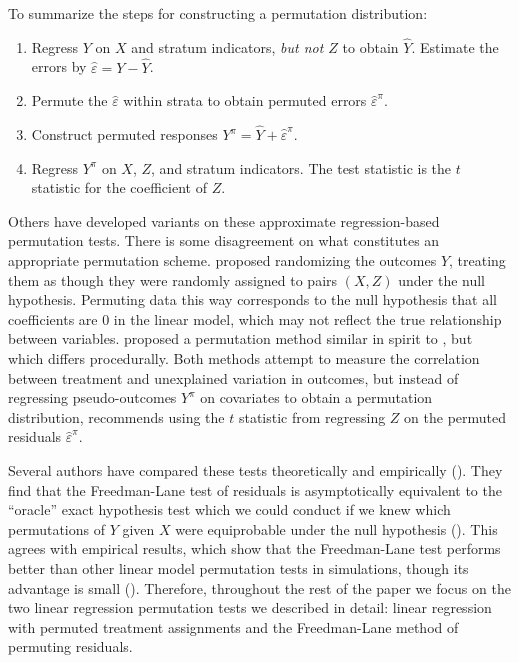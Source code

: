 \documentclass[12pt]{article}
\begin{document}
To summarize the steps for constructing a permutation distribution:

\begin{enumerate}
\item Regress $Y$ on $X$ and stratum indicators, \textit{but not $Z$} to obtain $\hat{Y}$. Estimate the errors by $\hat{\varepsilon} = Y - \hat{Y}$.
\item Permute the $\hat{\varepsilon}$ within strata to obtain permuted errors $\hat{\varepsilon}^\pi$.
\item Construct permuted responses $Y^\pi = \hat{Y}+ \hat{\varepsilon}^\pi$.
\item Regress $Y^\pi$ on $X$, $Z$, and stratum indicators. The test statistic is the $t$ statistic for the coefficient of $Z$.
\end{enumerate}


Others have developed variants on these approximate regression-based permutation tests. 
There is some disagreement on what constitutes an appropriate permutation scheme.
\cite{manly_randomization_2006} proposed randomizing the outcomes $Y$, treating them as though they were randomly assigned to pairs $(X, Z)$ under the null hypothesis.
Permuting data this way corresponds to the null hypothesis that all coefficients are 0 in the linear model, which may not reflect the true relationship between variables.
\cite{kennedy_randomization_1995} proposed a permutation method similar in spirit to \cite{freedman_nonstochastic_1983}, but which differs procedurally.
Both methods attempt to measure the correlation between treatment and unexplained variation in outcomes, but
instead of regressing pseudo-outcomes $Y^\pi$ on covariates to obtain a permutation distribution, \cite{kennedy_randomization_1995} recommends using the $t$ statistic from regressing $Z$ on the permuted residuals $\hat{\varepsilon}^\pi$. 

Several authors have compared these tests theoretically and empirically (\cite{anderson_empirical_1999, anderson_permutation_2001, kennedy_randomization_1996}).
They find that the Freedman-Lane test of residuals is asymptotically equivalent to the ``oracle'' exact hypothesis test which we could conduct if we knew which permutations of $Y$ given $X$ were equiprobable under the null hypothesis (\cite{anderson_permutation_2001}).
This agrees with empirical results, which show that the Freedman-Lane test performs better than other linear model permutation tests in simulations, though its advantage is small (\cite{anderson_empirical_1999}). 
Therefore, throughout the rest of the paper we focus on the two linear regression permutation tests we described in detail: linear regression with permuted treatment assignments and the Freedman-Lane method of permuting residuals.
\end{document}
